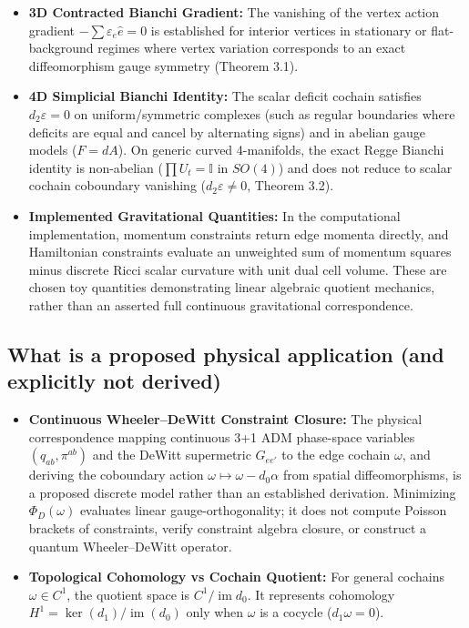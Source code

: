\documentclass[11pt]{article}
\begin{document}
\begin{itemize}[leftmargin=1.4em,itemsep=0.2em]
\item \textbf{3D Contracted Bianchi Gradient:} The vanishing of the vertex action gradient $-\sum \varepsilon_e \hat{e} = 0$ is established for interior vertices in stationary or flat-background regimes where vertex variation corresponds to an exact diffeomorphism gauge symmetry (Theorem 3.1).
\item \textbf{4D Simplicial Bianchi Identity:} The scalar deficit cochain satisfies $d_2 \varepsilon = 0$ on uniform/symmetric complexes (such as regular boundaries where deficits are equal and cancel by alternating signs) and in abelian gauge models ($F = dA$). On generic curved 4-manifolds, the exact Regge Bianchi identity is non-abelian ($\prod U_t = \mathbb{I}$ in $SO(4)$) and does not reduce to scalar cochain coboundary vanishing ($d_2 \varepsilon \ne 0$, Theorem 3.2).
\item \textbf{Implemented Gravitational Quantities:} In the computational implementation, momentum constraints return edge momenta directly, and Hamiltonian constraints evaluate an unweighted sum of momentum squares minus discrete Ricci scalar curvature with unit dual cell volume. These are chosen toy quantities demonstrating linear algebraic quotient mechanics, rather than an asserted full continuous gravitational correspondence.
\end{itemize}
\subsection{\texorpdfstring{What is a proposed physical application (and explicitly not derived)}{What is a proposed physical application (and explicitly not derived)}}

\begin{itemize}[leftmargin=1.4em,itemsep=0.2em]
\item \textbf{Continuous Wheeler--DeWitt Constraint Closure:} The physical correspondence mapping continuous 3+1 ADM phase-space variables $(q_{ab}, \pi^{ab})$ and the DeWitt supermetric $G_{ee'}$ to the edge cochain $\omega$, and deriving the coboundary action $\omega \mapsto \omega - d_0 \alpha$ from spatial diffeomorphisms, is a proposed discrete model rather than an established derivation. Minimizing $\Phi_D(\omega)$ evaluates linear gauge-orthogonality; it does not compute Poisson brackets of constraints, verify constraint algebra closure, or construct a quantum Wheeler--DeWitt operator.
\item \textbf{Topological Cohomology vs Cochain Quotient:} For general cochains $\omega \in C^1$, the quotient space is $C^1 / \operatorname{im} d_0$. It represents cohomology $H^1 = \ker(d_1) / \operatorname{im}(d_0)$ only when $\omega$ is a cocycle ($d_1 \omega = 0$).
\end{itemize}
\end{document}
